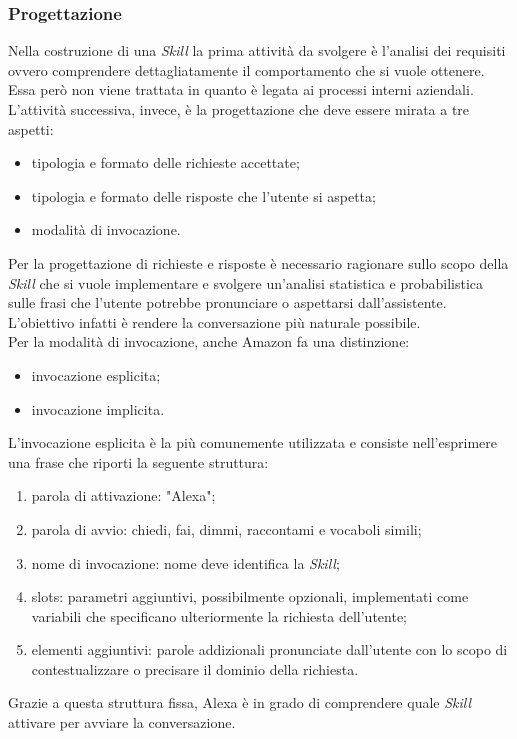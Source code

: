 		\subsubsection{Progettazione}
		Nella costruzione di una \emph{Skill} la prima attività da svolgere è l'analisi dei requisiti ovvero comprendere dettagliatamente il comportamento che si vuole ottenere. Essa però non viene trattata in quanto è legata ai processi interni aziendali. \\
		L'attività successiva, invece, è la progettazione che deve essere mirata a tre aspetti:
		\begin{itemize}
			\item tipologia e formato delle richieste accettate;
			\item tipologia e formato delle risposte che l'utente si aspetta;
			\item modalità di invocazione.
		\end{itemize}
		Per la progettazione di richieste e risposte è necessario ragionare sullo scopo della \emph{Skill} che si vuole implementare e svolgere un'analisi statistica e probabilistica sulle frasi che l'utente potrebbe pronunciare o aspettarsi dall'assistente. L'obiettivo infatti è rendere la conversazione più naturale possibile.\\
		Per la modalità di invocazione, anche Amazon fa una distinzione:
		\begin{itemize}
			\item invocazione esplicita;
			\item invocazione implicita.
		\end{itemize}
		L'invocazione esplicita è la più comunemente utilizzata e consiste nell'esprimere una frase che riporti la seguente struttura:
		\begin{enumerate}
			\item parola di attivazione: "Alexa";
			\item parola di avvio: chiedi, fai, dimmi, raccontami e vocaboli simili;
			\item nome di invocazione: nome deve identifica la \emph{Skill};
			\item slots: parametri aggiuntivi, possibilmente opzionali, implementati come variabili che specificano ulteriormente la richiesta dell'utente;
			\item elementi aggiuntivi: parole addizionali pronunciate dall'utente con lo scopo di contestualizzare o precisare il dominio della richiesta.
		\end{enumerate}
		Grazie a questa struttura fissa, Alexa è in grado di comprendere quale \emph{Skill} attivare per avviare la conversazione. \\
